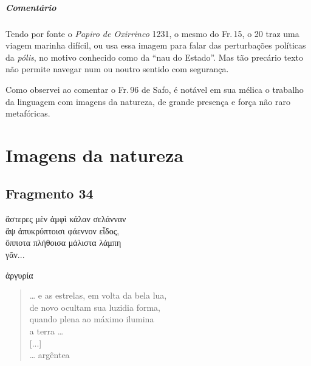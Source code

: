 {\paragraph{Comentário} Tendo por fonte o \emph{Papiro de Oxirrinco} 1231, o mesmo do Fr.\,15, o 20 traz uma viagem marinha difícil, ou usa essa imagem para falar das perturbações políticas da \emph{pólis}, no motivo conhecido como da ``nau do Estado''. Mas tão precário texto não permite navegar num ou noutro sentido com segurança.}

\begin{argumento}
Como observei ao comentar o Fr.\,96 de Safo, é notável em sua mélica o trabalho
da linguagem com imagens da natureza, de grande presença e força não raro
metafóricas.
\end{argumento}

\chapter{Imagens da natureza}


\section{Fragmento 34}

\begin{gkverse}
ἄστερες μὲν ἀμφὶ κάλαν σελάνναν\\
ἂψ ἀπυκρύπτοισι φάεννον εἶδος,\\
ὄπποτα πλήθοισα μάλιστα λάμπη\\
γᾶν...\\

\medskip 

\hspace*{23mm}{\minion [...]}

ἀργυρία
\end{gkverse}

\begin{verse}
\ldots{} e as estrelas, em volta da bela lua,\\
de novo ocultam sua luzidia forma,\\
quando plena ao máximo ilumina\\
a terra \ldots{}\\[2mm]

\hspace*{23mm}[...]\\[2mm]

\ldots{} argêntea
\end{verse}

